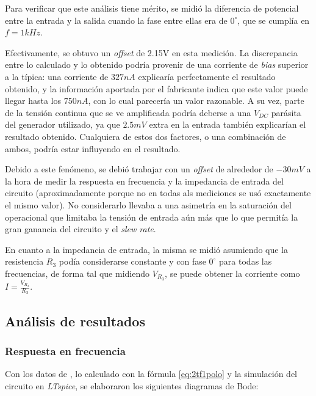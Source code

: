 \documentclass[../../main.tex]{subfiles}
\begin{document}
Para  verificar que este an\'alisis tiene m\'erito, se midi\'o la diferencia de potencial entre la entrada y la salida cuando la fase entre ellas era de $0^\circ$, que se cumpl\'ia en $f=1kHz$.


Efectivamente, se obtuvo un \textit{offset} de 2.15V en esta medici\'on. La discrepancia entre lo calculado y lo obtenido podr\'ia provenir de una corriente de \textit{bias} superior a la t\'ipica: una corriente de $327nA$ explicar\'ia perfectamente el resultado obtenido, y la informaci\'on aportada por el fabricante indica que este valor puede llegar hasta los $750nA$, con lo cual parecer\'ia un valor razonable. A su vez, parte de la tensi\'on continua que se ve amplificada podr\'ia deberse a una $V_{DC}$ par\'asita del generador utilizado, ya que $2.5mV$ extra en la entrada tambi\'en explicar\'ian el resultado obtenido. Cualquiera de estos dos factores, o una combinaci\'on de ambos, podr\'ia estar influyendo en el resultado.\par

Debido a este fen\'omeno, se debi\'o trabajar con un \textit{offset} de alrededor de $-30mV$ a la hora de medir la respuesta en frecuencia y la impedancia de entrada del circuito (aproximadamente porque no en todas als mediciones se us\'o exactamente el mismo valor). No considerarlo llevaba a una asimetr\'ia en la saturaci\'on del operacional que limitaba la tensi\'on de entrada a\'un m\'as que lo que permit\'ia la gran ganancia del circuito y el \textit{slew rate}. \par


En cuanto a la impedancia de entrada, la misma se midi\'o asumiendo que la resistencia $R_3$ pod\'ia considerarse constante y con fase $0^\circ$ para todas las frecuencias, de forma tal que midiendo $V_{R_3}$, se puede obtener la corriente como $I = \frac{V_{R_3}}{R_3}$.


\subsection{An\'alisis de resultados}

\subsubsection{Respuesta en frecuencia}

Con los datos de , lo calculado con la f\'ormula \ref{eq:2tf1polo} y la simulaci\'on del circuito en \textit{LTspice}, se elaboraron los siguientes diagramas de Bode:
 
\end{document}
